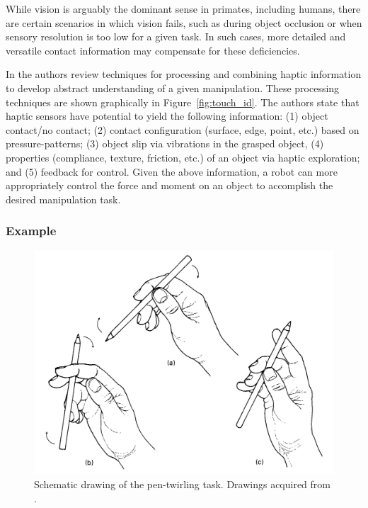 While vision is arguably the dominant sense in primates, including humans, there are certain scenarios in which vision fails, such as during object occlusion or when sensory resolution is too low for a given task.
In such cases, more detailed and versatile contact information may compensate for these deficiencies.

In \cite{cutkosky2008force} the authors review techniques for processing and combining haptic information to develop abstract understanding of a given manipulation.
These processing techniques are shown graphically in Figure~\ref{fig:touch_id}.
The authors state that haptic sensors have potential to yield the following information:
(1) object contact/no contact; 
(2) contact configuration (surface, edge, point, etc.) based on pressure-patterns; 
(3) object slip via vibrations in the grasped object, 
(4) properties (compliance, texture, friction, etc.) of an object via haptic exploration; and 
(5) feedback for control.
Given the above information, a robot can more appropriately control the force and moment on an object to accomplish the desired manipulation task.


\subsubsection*{Example}

\begin{figure}[hbt]
	\centering
	\includegraphics[width=\linewidth]{images/pen_twirling}
	\caption{Schematic drawing of the pen-twirling task. Drawings acquired from \cite{elliott1984classification}.}
	\label{fig:pen_twirling}
\end{figure}

